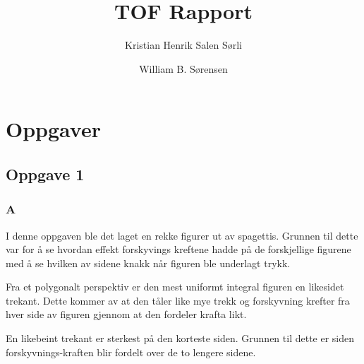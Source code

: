 \documentclass{report}
\author{
  Kristian Henrik Salen Sørli
  \and
  William B. Sørensen\\
}
\title{TOF Rapport}
\begin{document}
\maketitle

\tableofcontents

\chapter{Oppgaver}






\section{Oppgave 1}

\subsection{A}

I denne oppgaven ble det laget en rekke figurer ut av spagettis. Grunnen til dette var for å se hvordan effekt forskyvings kreftene hadde på de forskjellige figurene med å se hvilken av sidene knakk når figuren ble underlagt trykk.

Fra et polygonalt perspektiv er den mest uniformt integral figuren en likesidet trekant. Dette kommer av at den tåler like mye trekk og forskyvning krefter fra hver side av figuren gjennom at den fordeler krafta likt.

En likebeint trekant er sterkest på den korteste siden. Grunnen til dette er siden forskyvnings-kraften blir fordelt over de to lengere sidene.
\end{document}
